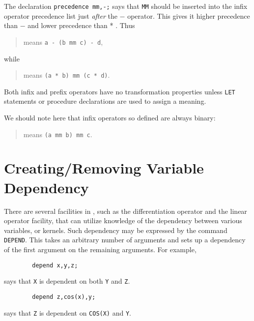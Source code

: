 The declaration {\tt precedence mm,-;} says that {\tt MM} should be
inserted into the infix operator precedence list just {\em after\/}
the $-$ operator.  This gives it higher precedence than $-$ and lower
precedence than * .  Thus

\begin{quote}
\hspace{0.2in}{\tt a - b mm c - d}\hspace{.3in} means \hspace{.3in}
{\tt a - (b mm c) - d},
\end{quote}
while
\begin{quote}
\hspace{0.2in}{\tt   a * b mm c * d}\hspace{.3in} means \hspace{.3in}
{\tt (a * b) mm (c * d)}.
\end{quote}

Both infix and prefix operators have no transformation
properties unless {\tt LET} statements or procedure
declarations are used to assign a meaning.

We should note here that infix operators so defined are always binary:
\begin{quote}
\hspace{0.2in}{\tt a mm b mm c}\hspace{.3in} means \hspace{.3in}
{\tt (a mm b) mm c}.
\end{quote}

\section{Creating/Removing Variable Dependency}

There are several facilities in {\REDUCE}, such as the differentiation
operator and the linear operator facility, that
can utilize knowledge of the dependency between various variables, or
kernels.  Such dependency may be expressed by the command {\tt
DEPEND}. This takes an arbitrary number of arguments and
sets up a dependency of the first argument on the remaining arguments.
For example,
\begin{verbatim}
        depend x,y,z;
\end{verbatim}
says that {\tt X} is dependent on both {\tt Y} and {\tt Z}.
\begin{verbatim}
        depend z,cos(x),y;
\end{verbatim}
says that {\tt Z} is dependent on {\tt COS(X)} and {\tt Y}.

